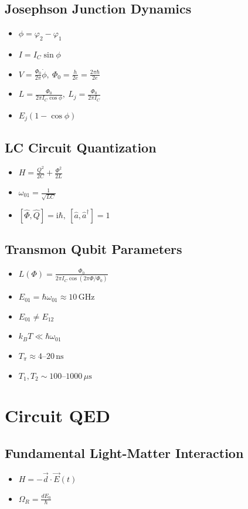 \documentclass{article}
\begin{document}
\subsection*{Josephson Junction Dynamics}
\begin{itemize}
    \item $\phi = \varphi_2 - \varphi_1$
    \item $I = I_C \sin \phi$
    \item $V = \frac{\Phi_0}{2\pi}\dot{\phi},\ \Phi_0 = \frac{h}{2e} = \frac{2\pi\hbar}{2e}$
    \item $L = \frac{\Phi_0}{2\pi I_C \cos \phi},\ L_j = \frac{\Phi_0}{2\pi I_C}$
    \item $E_j(1 - \cos \phi)$
\end{itemize}

\subsection*{LC Circuit Quantization}
\begin{itemize}
    \item $H = \frac{Q^2}{2C} + \frac{\Phi^2}{2L}$
    \item $\omega_{01} = \frac{1}{\sqrt{LC}}$
    \item $[\hat{\Phi}, \hat{Q}] = \mathrm{i}\hbar,\ [\hat{a}, \hat{a}^\dagger] = 1$
\end{itemize}

\subsection*{Transmon Qubit Parameters}
\begin{itemize}
    \item $L(\Phi) = \frac{\Phi_0}{2\pi I_C \cos(2\pi\Phi/\Phi_0)}$
    \item $E_{01} = \hbar\omega_{01} \approx 10\,\text{GHz}$
    \item $E_{01} \neq E_{12}$
    \item $k_B T \ll \hbar\omega_{01}$
    \item $T_\pi \approx 4$--$20\,\text{ns}$
    \item $T_1, T_2 \sim 100$--$1000\,\mu\text{s}$
\end{itemize}

\newpage
\section{Circuit QED}
\subsection*{Fundamental Light-Matter Interaction}
\begin{itemize}
    \item $H = -\vec{d} \cdot \vec{E}(t)$
    \item $\Omega_R = \frac{d E_0}{\hbar}$
\end{itemize}
\end{document}
